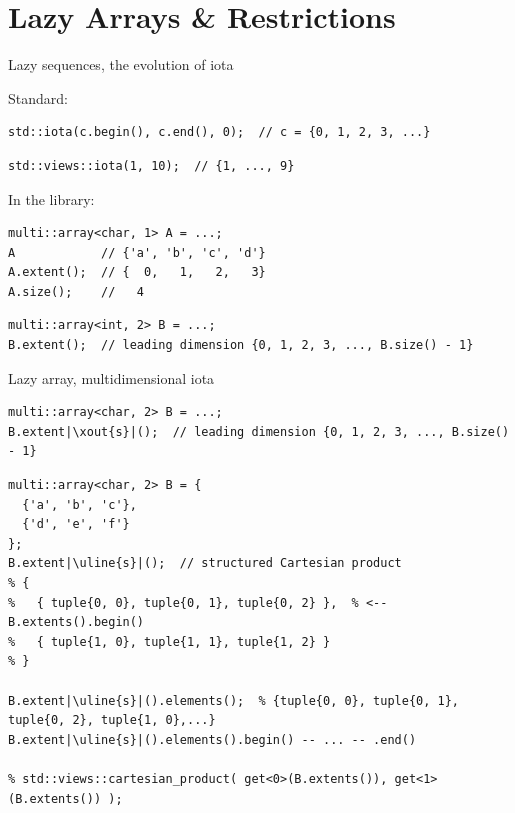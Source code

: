 \section{Lazy Arrays \& Restrictions}

\begin{frame}[fragile]{Lazy sequences, the evolution of iota}

Standard:
  \begin{lstlisting}
std::iota(c.begin(), c.end(), 0);  // c = {0, 1, 2, 3, ...}
  \end{lstlisting}
  \begin{lstlisting}
std::views::iota(1, 10);  // {1, ..., 9}
  \end{lstlisting}

In the library:
  \begin{lstlisting}
multi::array<char, 1> A = ...;
A            // {'a', 'b', 'c', 'd'}
A.extent();  // {  0,   1,   2,   3}
A.size();    //   4
  \end{lstlisting}
  \begin{lstlisting}
multi::array<int, 2> B = ...;
B.extent();  // leading dimension {0, 1, 2, 3, ..., B.size() - 1}
  \end{lstlisting}

\end{frame}

\begin{frame}[fragile]{Lazy array, multidimensional iota}

  \begin{lstlisting}[escapechar=|]
multi::array<char, 2> B = ...;
B.extent|\xout{s}|();  // leading dimension {0, 1, 2, 3, ..., B.size() - 1}
  \end{lstlisting}

  \begin{lstlisting}[escapechar=|]
multi::array<char, 2> B = {
  {'a', 'b', 'c'},
  {'d', 'e', 'f'}
};
B.extent|\uline{s}|();  // structured Cartesian product
% {
%   { tuple{0, 0}, tuple{0, 1}, tuple{0, 2} },  % <-- B.extents().begin()
%   { tuple{1, 0}, tuple{1, 1}, tuple{1, 2} }
% }

B.extent|\uline{s}|().elements();  % {tuple{0, 0}, tuple{0, 1}, tuple{0, 2}, tuple{1, 0},...}
B.extent|\uline{s}|().elements().begin() -- ... -- .end()

% std::views::cartesian_product( get<0>(B.extents()), get<1>(B.extents()) );
\end{lstlisting}

\end{frame}

